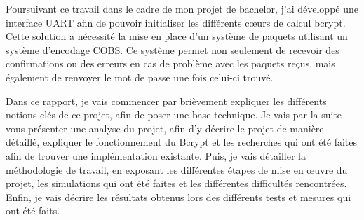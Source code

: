 Poursuivant ce travail dans le cadre de mon projet de bachelor, j'ai développé une interface UART afin de pouvoir initialiser les différents cœurs de calcul bcrypt.
Cette solution a nécessité la mise en place d'un système de paquets utilisant un système d'encodage COBS. 
Ce système permet non seulement de recevoir des confirmations ou des erreurs en cas de problème avec les paquets reçus, mais également de renvoyer le mot de passe une fois celui-ci trouvé.


Dans ce rapport, je vais commencer par brièvement expliquer les différents notions clés de ce projet, afin de poser une base technique. 
Je vais par la suite vous présenter une analyse du projet, afin d'y décrire le projet de manière détaillé, expliquer le fonctionnement du Bcrypt et les recherches qui ont été faites afin de trouver une implémentation existante. 
Puis, je vais détailler la méthodologie de travail, en exposant les différentes étapes de mise en œuvre du projet, les simulations qui ont été faites et les différentes difficultés rencontrées. 
Enfin, je vais décrire les résultats obtenus lors des différents tests et mesures qui ont été faits.